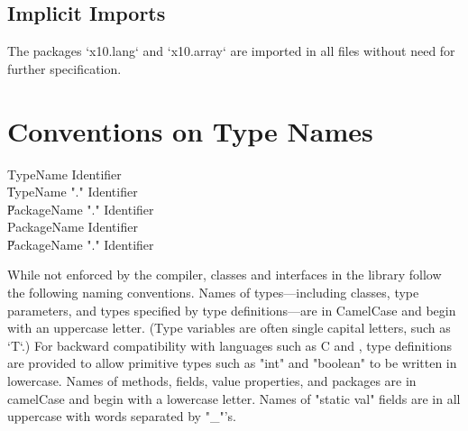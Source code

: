 \subsection{Implicit Imports}

The packages \xcd`x10.lang` and \xcd`x10.array` are imported in all files
without need for further specification.




\section{Conventions on Type Names}

\begin{grammar}
TypeName   \: Identifier \\
        \| TypeName \xcd"." Identifier \\
        \| PackageName \xcd"." Identifier \\
PackageName   \: Identifier \\
        \| PackageName \xcd"." Identifier \\
\end{grammar}


While not enforced by the compiler, classes and interfaces
in the \Xten{} library follow the following naming conventions.
Names of types---including classes,
type parameters, and types specified by type definitions---are in
CamelCase and begin with an uppercase letter.  (Type variables are often
single capital letters, such as \xcd`T`.)
For backward
compatibility with languages such as C and \java{}, type
definitions are provided to allow primitive types
such as \xcd"int" and \xcd"boolean" to be written in lowercase.
Names of methods, fields, value properties, and packages are in camelCase and
begin with a lowercase letter. 
Names of \xcd"static val" fields are in all uppercase with words
separated by \xcd"_"'s.


